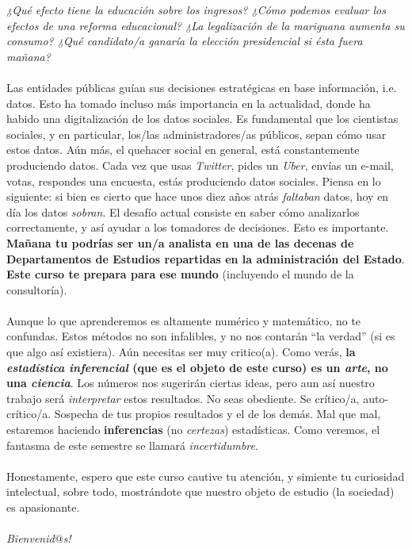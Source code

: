 \documentclass[letterpaper]{article}
\begin{document}
\emph{¿Qu\'e efecto tiene la educaci\'on sobre los ingresos? ¿C\'omo podemos evaluar los efectos de una reforma educacional? ¿La legalizaci\'on de la mariguana aumenta su consumo? ¿Qu\'e candidato/a ganar\'ia la elecci\'on presidencial si \'esta fuera ma\~nana?} 
\\
\\
Las entidades p\'ublicas gu\'ian sus decisiones estrat\'egicas en base informaci\'on, i.e. datos. Esto ha tomado incluso m\'as importancia en la actualidad, donde ha habido una digitalizaci\'on de los datos sociales. Es fundamental que los cientistas sociales, y en particular, los/las administradores/as p\'ublicos, sepan c\'omo usar estos datos. A\'un m\'as, el quehacer social en general, est\'a constantemente produciendo datos. Cada vez que usas \emph{Twitter}, pides un \emph{Uber}, env\'ias un e-mail, votas, respondes una encuesta, est\'as produciendo datos sociales. Piensa en lo siguiente: si bien es cierto que hace unos diez a\~nos atr\'as \emph{faltaban} datos, hoy en d\'ia los datos \emph{sobran}. El desaf\'io actual consiste en saber c\'omo analizarlos correctamente, y as\'i ayudar a los tomadores de decisiones. Esto es importante. {\bf Ma\~nana tu podr\'ias ser un/a analista en una de las decenas de Departamentos de Estudios repartidas en la administraci\'on del Estado}. {\bf Este curso te prepara para ese mundo} (incluyendo el mundo de la consultor\'ia).
\\
\\
Aunque lo que aprenderemos es altamente num\'erico y matem\'atico, no te confundas. Estos m\'etodos no son infalibles, y no nos contar\'an ``la verdad'' (si es que algo as\'i existiera). A\'un necesitas ser muy critico(a). Como ver\'as, {\bf la \emph{estad\'istica inferencial} (que es el objeto de este curso) es un \emph{arte}, no una \emph{ciencia}}. Los n\'umeros nos sugerir\'an ciertas ideas, pero aun as\'i nuestro trabajo ser\'a \emph{interpretar} estos resultados. No seas obediente. Se cr\'itico/a, auto-cr\'itico/a. Sospecha de tus propios resultados y el de los dem\'as. Mal que mal, estaremos haciendo {\bf inferencias} (no \emph{certezas}) estad\'isticas. Como veremos, el fantasma de este semestre se llamar\'a \emph{incertidumbre}. 
\\
\\
Honestamente, espero que este curso cautive tu atenci\'on, y simiente tu curiosidad intelectual, sobre todo, mostr\'andote que nuestro objeto de estudio (la sociedad) es apasionante. 
\\
\\
\emph{Bienvenid$@$s!}
\end{document}

